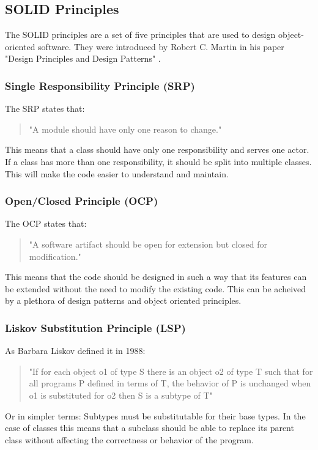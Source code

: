 \begin{spacing}{1.2}
    \subsection{SOLID Principles}
    The SOLID principles are a set of five principles that are used to design object-oriented software.
    They were introduced by Robert C. Martin in his paper "Design Principles and Design Patterns" \cite{martin2000design}.
    \subsubsection{Single Responsibility Principle (SRP)}
    The SRP states that:
    \begin{quote}
        "A module should have only one reason to change." \cite{clean}
    \end{quote}

    This means that a class should have only one responsibility and serves one actor. If a class
    has more than one responsibility, it should be split into multiple classes. This will make the
    code easier to understand and maintain.

    \subsubsection{Open/Closed Principle (OCP)}
    The OCP states that:
    \begin{quote}
        "A software artifact should be open for extension but closed for modification." \cite{meyer}
    \end{quote}

    This means that the code should be designed in such a way that its features can be extended
    without the need to modify the existing code. This can be acheived by a plethora of design patterns and
    object oriented principles.

    \subsubsection{Liskov Substitution Principle (LSP)}
    As Barbara Liskov defined it in 1988:
    \begin{quote}
        "If for each object o1 of type S there is an object o2 of type T such that for
        all programs P defined in terms of T, the behavior of P is unchanged when o1 is
        substituted for o2 then S is a subtype of T" \cite{liskov}
    \end{quote}

    Or in simpler terms: Subtypes must be substitutable for their base types. In the case of classes
    this means that a subclass should be able to replace its parent class without affecting the
    correctness or behavior of the program.


\end{spacing}
